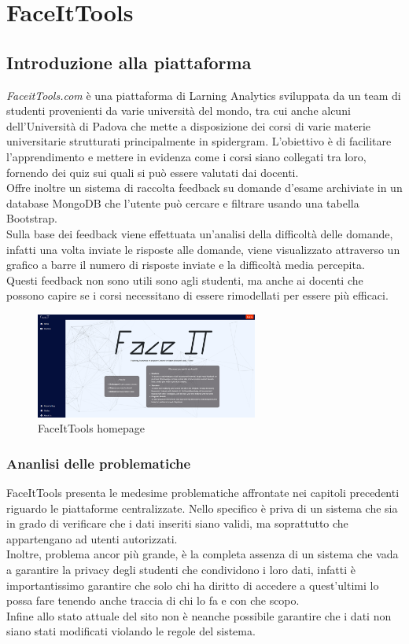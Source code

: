 \chapter{FaceItTools}
\section{Introduzione alla piattaforma}
\textit{FaceitTools.com} è una piattaforma di Larning Analytics sviluppata da un team di studenti provenienti da varie università del mondo, tra cui anche alcuni dell'Università di Padova che mette a disposizione dei corsi di varie materie universitarie strutturati principalmente in spidergram.
L'obiettivo è di facilitare l'apprendimento e mettere in evidenza come i corsi siano collegati tra loro, fornendo dei quiz sui quali si può essere valutati dai docenti.
\\Offre inoltre un sistema di raccolta feedback su domande d'esame archiviate in un database MongoDB che l’utente può cercare e filtrare usando una tabella Bootstrap.
\\Sulla base dei feedback viene effettuata un'analisi della difficoltà delle domande, infatti una volta inviate le risposte alle domande, viene visualizzato attraverso un grafico a barre il numero di risposte inviate e la difficoltà media percepita.
\\Questi feedback non sono utili sono agli studenti, ma anche ai docenti che possono capire se i corsi necessitano di essere rimodellati per essere più efficaci.
\begin{figure}[h]
    \centering
    \includegraphics[width=0.65\textwidth]{Immagini/FaceItTools.PNG}
    \caption{FaceItTools homepage}
\end{figure}
\subsection{Ananlisi delle problematiche}
FaceItTools presenta le medesime problematiche affrontate nei capitoli precedenti riguardo le piattaforme centralizzate.
Nello specifico è priva di un sistema che sia in grado di verificare che i dati inseriti siano validi, ma soprattutto che appartengano ad utenti autorizzati.
\\Inoltre, problema ancor più grande, è la completa assenza di un sistema che vada a garantire la privacy degli studenti che condividono i loro dati, 
infatti è importantissimo garantire che solo chi ha diritto di accedere a quest'ultimi lo possa fare tenendo anche traccia di chi lo fa e con che scopo.
\\Infine allo stato attuale del sito non è neanche possibile garantire che i dati non siano stati modificati violando le regole del sistema.
